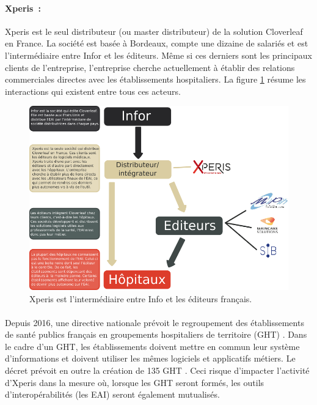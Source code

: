 			\paragraph{Xperis~:}
			Xperis est le seul distributeur (ou master distributeur) de la solution
			Cloverleaf en France. La société est basée à Bordeaux, compte une dizaine de
			salariés et est l'intermédiaire entre Infor et les éditeurs.
			Même si ces derniers sont les principaux clients de l'entreprise,
			l'entreprise cherche actuellement à établir des relations commerciales
			directes avec les établissements hospitaliers.\newline
			La figure \ref{xperis_secteur} résume les interactions qui existent entre
			tous ces acteurs.
			\begin{figure}[H]%
				\centering
				\includegraphics[width=16cm]{../img/xperis_secteur.png}
				\caption{\label{xperis_secteur} Xperis est l'intermédiaire entre Info et
				les éditeurs français.}
			\end{figure}
			
			\paragraph{}%
			Depuis 2016, une directive nationale prévoit le regroupement des établissements de 
			santé publics français en groupements hospitaliers de territoire (GHT) 
			\citep{valls_decret_2016}. Dans le cadre d'un GHT, les établissements doivent mettre 
			en commun leur système d'informations et doivent utiliser les mêmes logiciels et 
			applicatifs métiers. Le décret prévoit en outre la création de 135 GHT  
			\citep{touraine_marisol_2016}. Ceci risque d'impacter l'activité d'Xperis dans la 
			mesure où, lorsque les GHT seront formés, les outils d'interopérabilités 
			(les EAI) seront également mutualisés.
			
